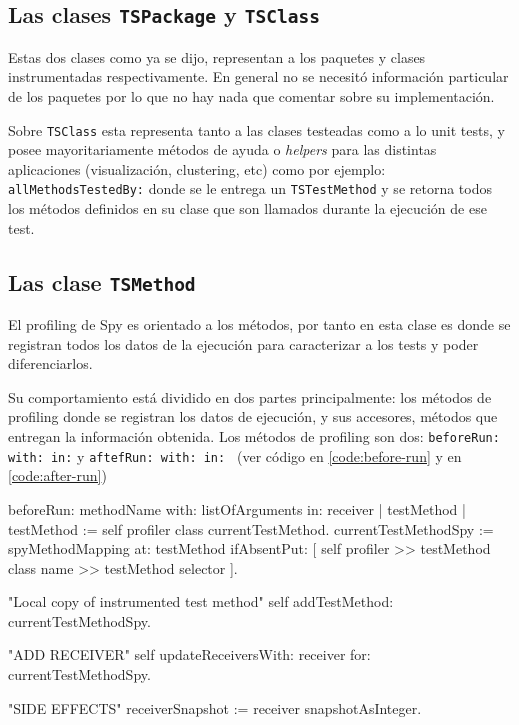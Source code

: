 \subsection{Las clases {\tt TSPackage} y {\tt TSClass}}

\par Estas dos clases como ya se dijo, representan a los paquetes y clases instrumentadas respectivamente. En general no se necesitó información particular de los paquetes por lo que no hay nada que comentar sobre su implementación.

\par Sobre {\tt TSClass} esta representa tanto a las clases testeadas como a lo unit tests, y posee mayoritariamente métodos de ayuda o \emph{helpers} para las distintas aplicaciones (visualización, clustering, etc) como por ejemplo: {\tt allMethodsTestedBy:} donde se le entrega un {\tt TSTestMethod} y se retorna todos los métodos definidos en su clase que son llamados durante la ejecución de ese test.  

\subsection{Las clase {\tt TSMethod} }
\par El profiling de Spy es orientado a los métodos, por tanto en esta clase es donde se registran todos los datos de la ejecución para caracterizar a los tests y poder diferenciarlos.
\par Su comportamiento está dividido en dos partes principalmente: los métodos de profiling donde se registran los datos de ejecución, y sus accesores, métodos que entregan la información obtenida. Los métodos de profiling son dos: {\tt beforeRun: with: in:} y {\tt aftefRun: with: in: } (ver código en \ref{code:before-run} y en \ref{code:after-run})

\begin{codeWithLineNumbers}
beforeRun: methodName with: listOfArguments in: receiver
	| testMethod |
	testMethod := self profiler class currentTestMethod.
	currentTestMethodSpy := 
			spyMethodMapping at: testMethod ifAbsentPut: 
				[ self profiler >> testMethod class name >> testMethod selector ].
		
	"Local copy of instrumented test method"	
	self addTestMethod: currentTestMethodSpy.

	"ADD RECEIVER"
	self updateReceiversWith: receiver for: currentTestMethodSpy.

	"SIDE EFFECTS"
	receiverSnapshot := receiver snapshotAsInteger.

\end{codeWithLineNumbers}\label{code:before-run} 


